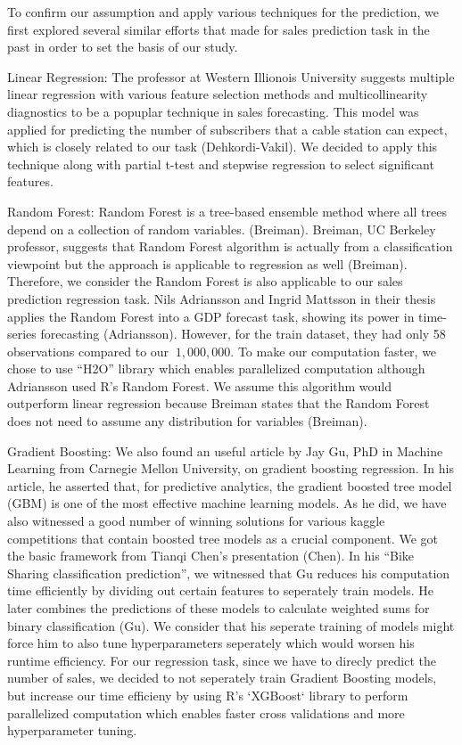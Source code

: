 \documentclass[letterpaper,twocolumn,11pt]{article}
\begin{document}
To confirm our assumption and apply various techniques for the prediction, we first explored several similar efforts that made for sales prediction task in the past in order to set the basis of our study. 

    Linear Regression: The professor at Western Illionois University suggests multiple linear regression with various feature selection methods and multicollinearity diagnostics to be a popuplar technique in sales forecasting. This model was applied for predicting the number of subscribers that a cable station can expect, which is closely related to our task (Dehkordi-Vakil). We decided to apply this technique along with partial t-test and stepwise regression to select significant features. 

    Random Forest: Random Forest is a tree-based ensemble method where all trees depend on a collection of random variables. (Breiman). Breiman, UC Berkeley professor, suggests that Random Forest algorithm is actually from a classification viewpoint but the approach is applicable to regression as well (Breiman). Therefore, we consider the Random Forest is also applicable to our sales prediction regression task. Nils Adriansson and Ingrid Mattsson in their thesis applies the Random Forest into a GDP forecast task, showing its power in time-series forecasting (Adriansson). However, for the train dataset, they had only 58 observations compared to our ${~1,000,000}$. To make our computation faster, we chose to use ``H2O'' library which enables parallelized computation although Adriansson used R's Random Forest. We assume this algorithm would outperform linear regression because Breiman states that the Random Forest does not need to assume any distribution for variables (Breiman).

    Gradient Boosting: We also found an useful article by Jay Gu, PhD in Machine Learning from Carnegie Mellon University, on gradient boosting regression. In his article, he asserted that, for predictive analytics, the gradient boosted tree model (GBM) is one of the most effective machine learning models. As he did, we have also witnessed a good number of winning solutions for various kaggle competitions that contain boosted tree models as a crucial component. We got the basic framework from Tianqi Chen's presentation (Chen). In his ``Bike Sharing classification prediction'', we witnessed that Gu reduces his computation time efficiently by dividing out certain features to seperately train models. He later combines the predictions of these models to calculate weighted sums for binary classification (Gu). We consider that his seperate training of models might force him to also tune hyperparameters seperately which would worsen his runtime efficiency. For our regression task, since we have to direcly predict the number of sales, we decided to not seperately train Gradient Boosting models, but increase our time efficieny by using R's `XGBoost` library to perform parallelized computation which enables faster cross validations and more hyperparameter tuning. 
\end{document}
